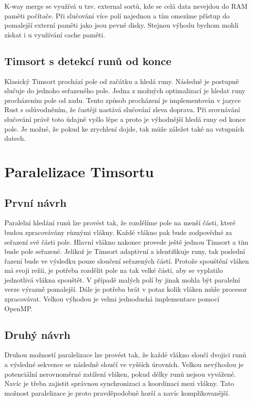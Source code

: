 \documentclass[thesis=B,czech]{FITthesis}[2019/12/23]
\begin{document}
K-way merge se využívá u tzv. external sortů, kde se celá data nevejdou do RAM paměti počítače. Při slučování více polí najednou a tím omezíme přístup do pomalejší externí paměti jako jsou pevné disky.\cite{externalsort} Stejnou výhodu bychom mohli získat i u využívání cache paměti.

\subsection{Timsort s detekcí runů od konce}
Klasický Timsort prochází pole od začátku a hledá runy. Následně je postupně slučuje do jednoho seřazeného pole. Jedna z možných optimalizací je hledat runy procházením pole od zadu. Tento způsob procházení je implementován v jazyce Rust s odůvodněním, že častěji nastává slučování zleva doprava. Při srovnávání slučování právě toto údajně vyšlo lépe a proto je výhodnější hledá runy od konce pole.\cite{rustimpl} Je možné, že pokud ke zrychlení dojde, tak může záležet také na vstupních datech.

\section{Paralelizace Timsortu}


\subsection{První návrh}
Paralelní hledání runů lze provést tak, že rozdělíme pole na menší části, které budou zpracovávány různými vlákny. Každé vlákno pak bude zodpovědné za seřazení své části pole. Hlavní vlákno nakonec provede ještě jednou Timsort a tím bude pole seřazené. Jelikož je Timsort adaptivní a identifikuje runy, tak poslední řazení bude ve výsledku pouze sloučení seřazených částí. Protože spouštění vláken má svoji režii, je potřeba rozdělit pole na tak velké části, aby se vyplatilo jednotlivá vlákna spouštět. V případě malých polí by jinak mohla být paralelní verze výrazně pomalejší. Dále je potřeba brát v potaz kolik vláken může procesor zpracovávat. Velkou výhodou je velmi jednoduchá implementace pomocí OpenMP.\cite{openmp1}

\subsection{Druhý návrh}
Druhou možností paralelizace lze provést tak, že každé vlákno sloučí dvojici runů a výsledné sekvence se následně sloučí ve vyšších úrovních. Velkou nevýhodou je potenciální nerovnoměrné zatížení vláken, pokud délky runů nejsou vyvážené. Navíc je třeba zajistit správnou synchronizaci a koordinaci mezi vlákny. Tato možnost paralelizace je proto pravděpodobně horší a navíc komplikovanější. 
\end{document}
